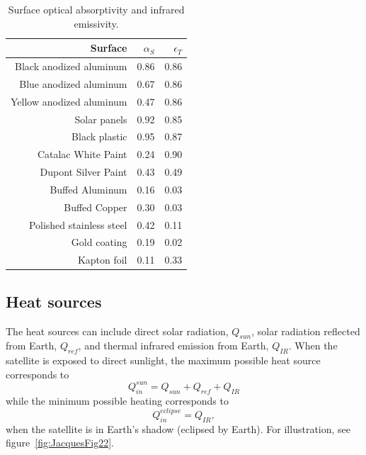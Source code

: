 \documentclass[]{aastex62}
\def\eq#1{\begin{equation} #1 \end{equation}}
\begin{document}
\begin{table}[t]
	\centering
	\caption{Surface optical absorptivity and infrared emissivity. }
	\label{tab:inputsAbsEmiss}
	\begin{tabular}{r|r|r} %
		\hline
  	                  Surface       &    $\alpha_S$  &   $\epsilon_T$    \\
		\hline
  Black anodized aluminum  &       0.86      &         0.86     \\ 
    Blue anodized aluminum  &       0.67      &         0.86     \\ 
 Yellow anodized aluminum  &       0.47     &         0.86     \\ 
   Solar panels                      &        0.92     &         0.85     \\
   Black plastic                     &       0.95       &         0.87     \\ 
   Catalac White Paint          &        0.24      &         0.90      \\ 
   Dupont Silver Paint        &          0.43      &         0.49      \\
   Buffed Aluminum           &          0.16      &         0.03      \\  
    Buffed Copper               &          0.30      &         0.03      \\  
  Polished stainless steel   &         0.42        &        0.11     \\ 
      Gold coating                &        0.19        &       0.02       \\
     Kapton foil                    &       0.11         &        0.33      \\
		\hline
	\end{tabular} 
\end{table}

 



\subsection{Heat sources} 

The heat sources can include direct solar radiation, $Q_{sun}$, solar radiation reflected from Earth, 
$Q_{ref}$, and thermal infrared emission from Earth, $Q_{IR}$. When the satellite is exposed to direct 
sunlight, the maximum possible heat source corresponds to 
\eq{
\label{eq:QinSun} 
                   Q_{in}^{sun}  = Q_{sun} + Q_{ref} + Q_{IR}  
} 
while the minimum possible heating corresponds to 
\eq{
\label{eq:QinEclipse} 
                     Q_{in}^{eclipse}  = Q_{IR},
} 
when the satellite is in Earth's shadow (eclipsed by Earth). For illustration, see figure~\ref{fig:JacquesFig22}. 
\end{document}
